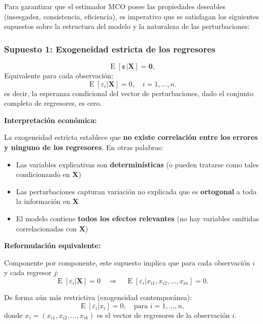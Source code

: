 \documentclass[11pt,a4paper]{article}
\DeclareMathOperator{\E}{E}
\begin{document}
Para garantizar que el estimador MCO posee las propiedades deseables (insesgadez, consistencia, eficiencia), es imperativo que se satisfagan los siguientes supuestos sobre la estructura del modelo y la naturaleza de las perturbaciones:

\subsubsection{Supuesto 1: Exogeneidad estricta de los regresores}

\begin{tcolorbox}[colback=white, colframe=blue!60, colbacktitle=blue!60, coltitle=white, title=Supuesto 1: Exogeneidad Estricta, fonttitle=\bfseries]
\[
\boxed{\E[\boldsymbol{\varepsilon}|\mathbf{X}] = \mathbf{0}},
\]
Equivalente para cada observación:
\[
\boxed{\E[\varepsilon_i|\mathbf{X}] = 0, \quad i=1,\dots,n}.
\]
es decir, la esperanza condicional del vector de perturbaciones, dado el conjunto completo de regresores, es cero.
\end{tcolorbox}

\noindent\textbf{Interpretación económica:}

La exogeneidad estricta establece que \textbf{no existe correlación entre los errores y ninguno de los regresores}. En otras palabras:

\begin{itemize}
\item Las variables explicativas son \textbf{determinísticas} (o pueden tratarse como tales condicionando en \(\mathbf{X}\))
\item Las perturbaciones capturan variación no explicada que es \textbf{ortogonal} a toda la información en \(\mathbf{X}\)
\item El modelo contiene \textbf{todos los efectos relevantes} (no hay variables omitidas correlacionadas con \(\mathbf{X}\))
\end{itemize}

\noindent\textbf{Reformulación equivalente:}

Componente por componente, este supuesto implica que para cada observación \(i\) y cada regresor \(j\):
\[
\E[\varepsilon_i | \mathbf{X}] = 0 \quad \Rightarrow \quad \E[\varepsilon_i | x_{i1}, x_{i2}, \dots, x_{in}] = 0.
\]

De forma aún más restrictiva (exogeneidad contemporánea):
\[
\E[\varepsilon_i | x_i] = 0, \quad \text{para } i=1,\dots,n,
\]
donde \(x_i = (x_{i1}, x_{i2}, \dots, x_{ik})\) es el vector de regresores de la observación \(i\).
\end{document}

